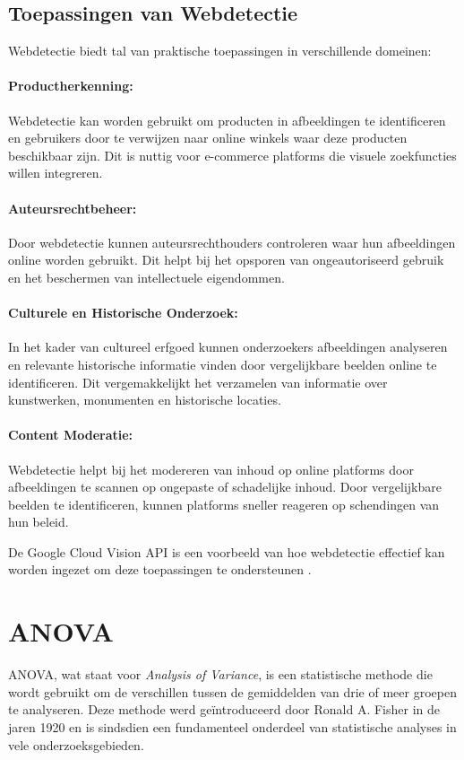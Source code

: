 \subsection{Toepassingen van Webdetectie}
Webdetectie biedt tal van praktische toepassingen in verschillende domeinen:

\paragraph{Productherkenning:}
Webdetectie kan worden gebruikt om producten in afbeeldingen te identificeren en gebruikers door te verwijzen naar online winkels waar deze producten beschikbaar zijn. Dit is nuttig voor e-commerce platforms die visuele zoekfuncties willen integreren.

\paragraph{Auteursrechtbeheer:}
Door webdetectie kunnen auteursrechthouders controleren waar hun afbeeldingen online worden gebruikt. Dit helpt bij het opsporen van ongeautoriseerd gebruik en het beschermen van intellectuele eigendommen.

\paragraph{Culturele en Historische Onderzoek:}
In het kader van cultureel erfgoed kunnen onderzoekers afbeeldingen analyseren en relevante historische informatie vinden door vergelijkbare beelden online te identificeren. Dit vergemakkelijkt het verzamelen van informatie over kunstwerken, monumenten en historische locaties.

\paragraph{Content Moderatie:}
Webdetectie helpt bij het modereren van inhoud op online platforms door afbeeldingen te scannen op ongepaste of schadelijke inhoud. Door vergelijkbare beelden te identificeren, kunnen platforms sneller reageren op schendingen van hun beleid.

De Google Cloud Vision API is een voorbeeld van hoe webdetectie effectief kan worden ingezet om deze toepassingen te ondersteunen \autocite{googleVisionAPI}.


\section{ANOVA}
ANOVA, wat staat voor \textit{Analysis of Variance}, is een statistische methode die wordt gebruikt om de verschillen tussen de gemiddelden van drie of meer groepen te analyseren. Deze methode werd geïntroduceerd door Ronald A. Fisher in de jaren 1920 en is sindsdien een fundamenteel onderdeel van statistische analyses in vele onderzoeksgebieden.

